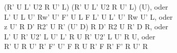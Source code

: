(R' U L' U2 R U' L) (R' U L' U2 R U' L) (U), oder\\
L' U L U' Rw' U' F' U L F L' U L' U' Rw U' L, oder\\
z U' R D' R2' U R' (U' D) R D' R2 U R' D R, oder\\
L' U R' U2' L U' L' R U R' U2' L U' R U, oder\\
R' U R U' R' F' U' F R U R' F R' F' R U' R\\
